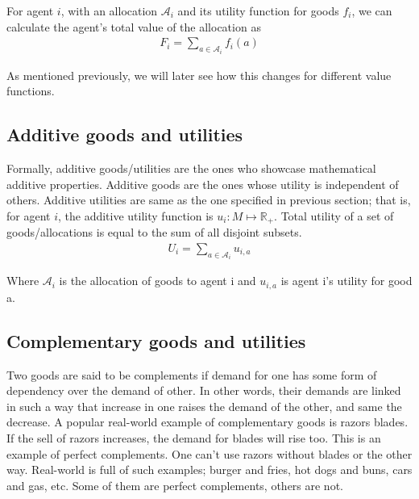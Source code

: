 For agent $i$, with an allocation $\mathcal{A}_i$ and its utility function for goods $f_i$, we can calculate the agent's total value of the allocation as
\begin{gather}
    F_i = \sum_{a \in \mathcal{A}_i} f_i(a)
\end{gather}

As mentioned previously, we will later see how this changes for different value functions.


\subsection{Additive goods and utilities}
Formally, additive goods/utilities are the ones who showcase mathematical additive properties. Additive goods are the ones whose utility is independent of others. Additive utilities are same as the one specified in previous section; that is, for agent $i$, the additive utility function is $u_i: M\mapsto \mathbb{R_+}$. Total utility of a set of goods/allocations is equal to the sum of all disjoint subsets.
\begin{gather}
    U_i = \sum_{a \in \mathcal{A}_i} u_{i,a}
\end{gather}

Where $\mathcal{A}_i$ is the allocation of goods to agent i and $u_{i,a}$ is agent i's utility for good a.

\subsection{Complementary goods and utilities}
\label{section_complementary}

Two goods are said to be complements if demand for one has some form of dependency over the demand of other. In other words, their demands are linked in such a way that increase in one raises the demand of the other, and same the decrease. A popular real-world example of complementary goods is razors blades. If the sell of razors increases, the demand for blades will rise too. This is an example of perfect complements. One can't use razors without blades or the other way. Real-world is full of such examples; burger and fries, hot dogs and buns, cars and gas, etc. Some of them are perfect complements, others are not.

